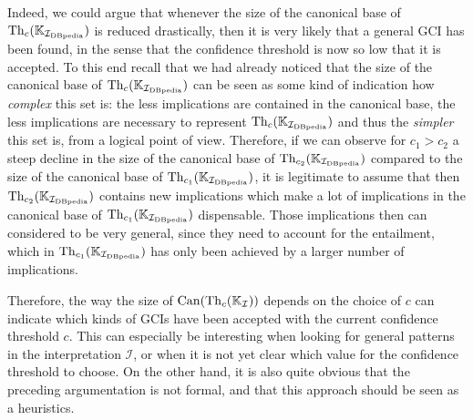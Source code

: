 Indeed, we could argue that whenever the size of the canonical base of $\operatorname{Th}_c({\mathbb{K}}_{{\mathcal{I}_{\text{DBpedia}}}})$ is reduced drastically, then it is very likely that a general GCI has been
found, in the sense that the confidence threshold is now so low that it is accepted.  To
this end recall that we had already noticed that the size of the canonical base of
$\operatorname{Th}_c({\mathbb{K}}_{{\mathcal{I}_{\text{DBpedia}}}})$ can be seen as some kind of indication how \emph{complex} this
set is: the less implications are contained in the canonical base, the less implications
are necessary to represent $\operatorname{Th}_c({\mathbb{K}}_{\mathcal{I}_{\text{DBpedia}}})$ and thus the \emph{simpler} this set
is, from a logical point of view.  Therefore, if we can observe for $c_1 > c_2$ a steep
decline in the size of the canonical base of $\operatorname{Th}_{c_2}({\mathbb{K}}_{{\mathcal{I}_{\text{DBpedia}}}})$ compared to
the size of the canonical base of $\operatorname{Th}_{c_1}({\mathbb{K}}_{{\mathcal{I}_{\text{DBpedia}}}})$, it is legitimate to
assume that then $\operatorname{Th}_{c_2}({\mathbb{K}}_{{\mathcal{I}_{\text{DBpedia}}}})$ contains new implications which make a
lot of implications in the canonical base of $\operatorname{Th}_{c_1}({\mathbb{K}}_{\mathcal{I}_{\text{DBpedia}}})$ dispensable.
Those implications then can considered to be very general, since they need to account for
the entailment, which in $\operatorname{Th}_{c_1}({\mathbb{K}}_{\mathcal{I}_{\text{DBpedia}}})$ has only been achieved by a larger
number of implications.

Therefore, the way the size of $\operatorname{Can}(\operatorname{Th}_c({\mathbb{K}}_{\mathcal{I}}))$ depends on the choice
of $c$ can indicate which kinds of GCIs have been accepted with the current confidence
threshold $c$.  This can especially be interesting when looking for general patterns in
the interpretation $\mathcal{I}$, or when it is not yet clear which value for the
confidence threshold to choose.  On the other hand, it is also quite obvious that the
preceding argumentation is not formal, and that this approach should be seen as a
heuristics.

